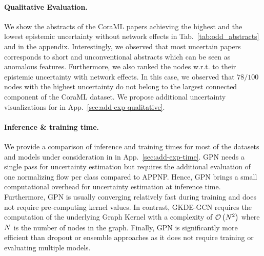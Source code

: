 \paragraph{Qualitative Evaluation.} We show the abstracts of the CoraML papers achieving the highest and the lowest epistemic uncertainty without network effects in Tab.~\ref{tab:odd_abstracts} and in the appendix. Interestingly, we observed that most uncertain papers corresponds to short and unconventional abstracts which can be seen as anomalous features. Furthermore, we also ranked the nodes w.r.t. to their epistemic uncertainty with network effects. In this case, we observed that $78/100$ nodes with the highest uncertainty do not belong to the largest connected component of the CoraML dataset. We propose additional uncertainty visualizations for \GPNacro{} in App.~\ref{sec:add-exp-qualitative}. 

\paragraph{Inference \& training time.} We provide a comparison of inference and training times for most of the datasets and models under consideration in in App.~\ref{sec:add-exp-time}. GPN needs a single pass for uncertainty estimation but requires the additional evaluation of one normalizing flow per class compared to APPNP. Hence, GPN brings a small computational overhead for uncertainty estimation at inference time. Furthermore, GPN is usually converging relatively fast during training and does not require pre-computing kernel values. In contrast, GKDE-GCN \citep{Zhao2020} requires the computation of the underlying Graph Kernel with a complexity of $\mathcal{O}\left(N^2\right)$ where $N$ is the number of nodes in the graph. Finally, GPN is significantly more efficient than dropout or ensemble approaches as it does not require training or evaluating multiple models.


